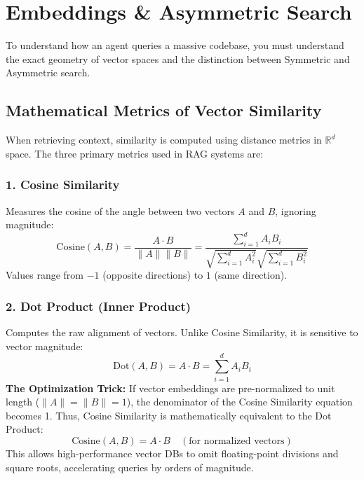 \chapter{Embeddings \& Asymmetric Search}

To understand how an agent queries a massive codebase, you must understand the exact geometry of vector spaces and the distinction between Symmetric and Asymmetric search.

\section{Mathematical Metrics of Vector Similarity}

When retrieving context, similarity is computed using distance metrics in $\mathbb{R}^d$ space. The three primary metrics used in RAG systems are:

\subsection{1. Cosine Similarity}
Measures the cosine of the angle between two vectors $A$ and $B$, ignoring magnitude:
\begin{equation}
\text{Cosine}(A, B) = \frac{A \cdot B}{\|A\| \|B\|} = \frac{\sum_{i=1}^d A_i B_i}{\sqrt{\sum_{i=1}^d A_i^2} \sqrt{\sum_{i=1}^d B_i^2}}
\end{equation}
Values range from $-1$ (opposite directions) to $1$ (same direction).

\subsection{2. Dot Product (Inner Product)}
Computes the raw alignment of vectors. Unlike Cosine Similarity, it is sensitive to vector magnitude:
\begin{equation}
\text{Dot}(A, B) = A \cdot B = \sum_{i=1}^d A_i B_i
\end{equation}
\textbf{The Optimization Trick:} If vector embeddings are pre-normalized to unit length ($\|A\| = \|B\| = 1$), the denominator of the Cosine Similarity equation becomes 1. Thus, Cosine Similarity is mathematically equivalent to the Dot Product:
\begin{equation}
\text{Cosine}(A, B) = A \cdot B \quad (\text{for normalized vectors})
\end{equation}
This allows high-performance vector DBs to omit floating-point divisions and square roots, accelerating queries by orders of magnitude.


